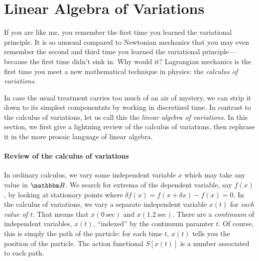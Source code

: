 \section{Linear Algebra of Variations}

If you are like me, you remember the first time you learned the variational principle. It is so unusual compared to Newtonian mechanics that you may even remember the second and third time you learned the variational principle---because the first time didn't sink in. Why would it? Lagrangian mechanics is the first time you meet a new mathematical technique in physics: the \emph{calculus of variations}.

In case the usual treatment carries too much of an air of mystery, we can strip it down to its simplest componentnts by working in discretized time. In contrast to the calculus of variations, let us call this the \emph{linear algebra of variations}. In this section, we first give a lightning review of the calculus of variations, then rephrase it in the more prosaic language of linear algebra.

\paragraph{Review of the calculus of variations}
In ordinary calculus, we vary some independent variable $x$ which may take any value in $\RR$. We search for extrema of the dependent variable, say $f(x)$, by looking at stationary points where $\delta f(x) = f(x+ \delta{x}) - f(x) = 0$. In the {calculus of variations}, we vary a separate independent variable $x(t)$ for \emph{each value of $t$}. That means that $x(0~\text{sec})$ and $x(1.2~\text{sec})$. There are a \emph{continuum} of independent variables, $x(t)$, ``indexed'' by the continuum paramter $t$. Of course, this is simply the path of the particle: for each time $t$, $x(t)$ tells you the position of the particle. The action functional $S[x(t)]$ is a number associated to each path.

